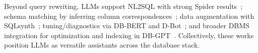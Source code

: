  Beyond query rewriting, LLMs support NL2SQL with strong Spider results~\cite{li2023can};  schema matching by inferring column correspondences~\cite{parciak2407schema}; data augmentation with SQLsynth~\cite{tian2025text};  tuning/diagnostics via DB\mbox{-}BERT and D\mbox{-}Bot~\cite{trummer2022db,zhou2023d}; and broader DBMS integration for optimization and indexing in DB\mbox{-}GPT~\cite{zhou2023dbgpt}. Collectively, these works position LLMs as versatile assistants across the database stack.




